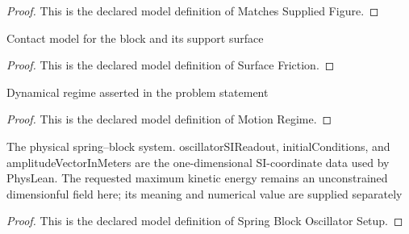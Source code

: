 \begin{proof}
  This is the declared model definition of Matches Supplied Figure.
\end{proof}
\begin{definition}
  \label{def:physics:phyx-mini-0280:phyxminiproblems-problemphyxmini0280-surfacefriction}
  Contact model for the block and its support surface
\end{definition}
\begin{proof}
  This is the declared model definition of Surface Friction.
\end{proof}
\begin{definition}
  \label{def:physics:phyx-mini-0280:phyxminiproblems-problemphyxmini0280-motionregime}
  Dynamical regime asserted in the problem statement
\end{definition}
\begin{proof}
  This is the declared model definition of Motion Regime.
\end{proof}
\begin{definition}
  \label{def:physics:phyx-mini-0280:phyxminiproblems-problemphyxmini0280-springblockoscillatorsetup}
  The physical spring--block system. oscillatorSIReadout, initialConditions, and amplitudeVectorInMeters are the one-dimensional SI-coordinate data used by PhysLean. The requested maximum kinetic energy remains an unconstrained dimensionful field here; its meaning and numerical value are supplied separately
\end{definition}
\begin{proof}
  This is the declared model definition of Spring Block Oscillator Setup.
\end{proof}
